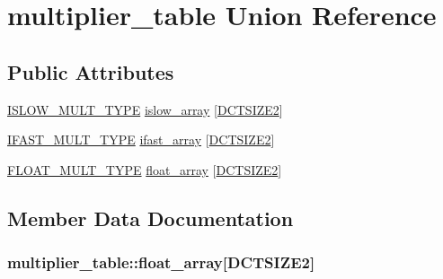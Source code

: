 \hypertarget{unionmultiplier__table}{}\section{multiplier\+\_\+table Union Reference}
\label{unionmultiplier__table}
\subsection*{Public Attributes}
\begin{DoxyCompactItemize}
\item 
\hyperlink{jdct_8h_a057ec4d475bf55bf8e28a146c8d9bce1}{I\+S\+L\+O\+W\+\_\+\+M\+U\+L\+T\+\_\+\+T\+Y\+P\+E} \hyperlink{unionmultiplier__table_a8585c9759405a74e7cbd4d6b3f8da073}{islow\+\_\+array} \mbox{[}\hyperlink{jpeglib_8h_af89dff4200396563157d4a1e59da3bdf}{D\+C\+T\+S\+I\+Z\+E2}\mbox{]}
\item 
\hyperlink{jdct_8h_a2ce5dea49d73b718b055db4d04b4a5a3}{I\+F\+A\+S\+T\+\_\+\+M\+U\+L\+T\+\_\+\+T\+Y\+P\+E} \hyperlink{unionmultiplier__table_a815932c92e5d7cea970c6cddb5bbf6f1}{ifast\+\_\+array} \mbox{[}\hyperlink{jpeglib_8h_af89dff4200396563157d4a1e59da3bdf}{D\+C\+T\+S\+I\+Z\+E2}\mbox{]}
\item 
\hyperlink{jdct_8h_ac3f02a81c5cd0fca588c66be99b42691}{F\+L\+O\+A\+T\+\_\+\+M\+U\+L\+T\+\_\+\+T\+Y\+P\+E} \hyperlink{unionmultiplier__table_a3867da0f271dbfd782ad1e1603e71e88}{float\+\_\+array} \mbox{[}\hyperlink{jpeglib_8h_af89dff4200396563157d4a1e59da3bdf}{D\+C\+T\+S\+I\+Z\+E2}\mbox{]}
\end{DoxyCompactItemize}


\subsection{Member Data Documentation}
\hypertarget{unionmultiplier__table_a3867da0f271dbfd782ad1e1603e71e88}{}
\subsubsection[{float\+\_\+array}]{ multiplier\+\_\+table\+::float\+\_\+array\mbox{[}{\bf D\+C\+T\+S\+I\+Z\+E2}\mbox{]}}\label{unionmultiplier__table_a3867da0f271dbfd782ad1e1603e71e88}
\hypertarget{unionmultiplier__table_a815932c92e5d7cea970c6cddb5bbf6f1}{}
